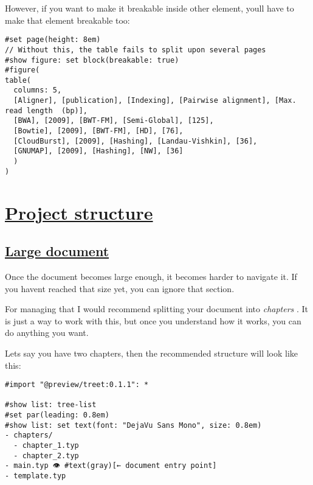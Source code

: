 However, if you want to make it breakable inside other element,
you\textquotesingle ll have to make that element breakable too:

\begin{verbatim}
#set page(height: 8em)
// Without this, the table fails to split upon several pages
#show figure: set block(breakable: true)
#figure(
table(
  columns: 5,
  [Aligner], [publication], [Indexing], [Pairwise alignment], [Max. read length  (bp)],
  [BWA], [2009], [BWT-FM], [Semi-Global], [125],
  [Bowtie], [2009], [BWT-FM], [HD], [76],
  [CloudBurst], [2009], [Hashing], [Landau-Vishkin], [36],
  [GNUMAP], [2009], [Hashing], [NW], [36]
  )
)
\end{verbatim}

\pandocbounded{}

\pandocbounded{}

\section{\texorpdfstring{\hyperref[project-structure]{Project
structure}}{Project structure}}\label{project-structure}

\subsection{\texorpdfstring{\hyperref[large-document]{Large
document}}{Large document}}\label{large-document}

Once the document becomes large enough, it becomes harder to navigate
it. If you haven\textquotesingle t reached that size yet, you can ignore
that section.

For managing that I would recommend splitting your document into
\emph{chapters} . It is just a way to work with this, but once you
understand how it works, you can do anything you want.

Let\textquotesingle s say you have two chapters, then the recommended
structure will look like this:

\begin{verbatim}
#import "@preview/treet:0.1.1": *

#show list: tree-list
#set par(leading: 0.8em)
#show list: set text(font: "DejaVu Sans Mono", size: 0.8em)
- chapters/
  - chapter_1.typ
  - chapter_2.typ
- main.typ 👁 #text(gray)[← document entry point]
- template.typ
\end{verbatim}

